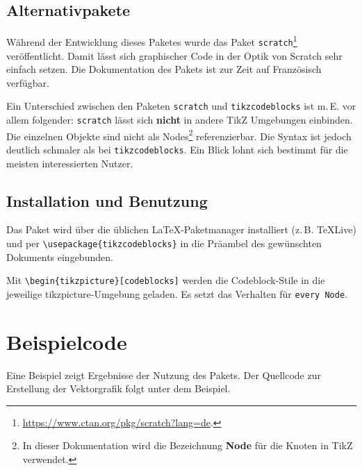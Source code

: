 \documentclass[12pt,a4paper]{ltxdoc}
\begin{document}
\subsection{Alternativpakete}

Während der Entwicklung dieses Paketes wurde das Paket \texttt{scratch}\footnote{\url{https://www.ctan.org/pkg/scratch?lang=de}.} veröffentlicht. Damit lässt sich graphischer Code in der Optik von Scratch sehr einfach setzen. Die Dokumentation des Pakets ist zur Zeit auf Französisch verfügbar.

Ein Unterschied zwischen den Paketen \texttt{scratch} und \texttt{tikzcodeblocks} ist m.\,E. vor allem folgender: \texttt{scratch} lässt sich \textbf{nicht} in andere TikZ Umgebungen einbinden. Die einzelnen Objekte sind nicht als Nodes\footnote{In dieser Dokumentation wird die Bezeichnung \textbf{Node} für die Knoten in TikZ verwendet.} referenzierbar. Die Syntax ist jedoch deutlich schmaler als bei \texttt{tikzcodeblocks}. Ein Blick lohnt sich bestimmt für die meisten interessierten Nutzer.


\subsection{Installation und Benutzung}

Das Paket wird über die üblichen \LaTeX-Paketmanager installiert (z.\,B. \TeX{}Live)
und per  \lstinline|\usepackage{tikzcodeblocks}| in die Präambel des gewünschten Dokuments eingebunden.

 Mit \lstinline|\begin{tikzpicture}[codeblocks]| werden die Codeblock-Stile in die jeweilige tikzpicture-Umgebung  geladen. Es setzt das Verhalten für \lstinline[language=TeX]|every Node|.

\begin{minipage}{0.6\textwidth}
	
\end{minipage}
\begin{minipage}{0.4\textwidth}

\end{minipage}


\section{Beispielcode}

Eine Beispiel zeigt Ergebnisse der Nutzung des Pakets.
Der Quellcode zur Erstellung der Vektorgrafik folgt unter dem Beispiel.
\end{document}
